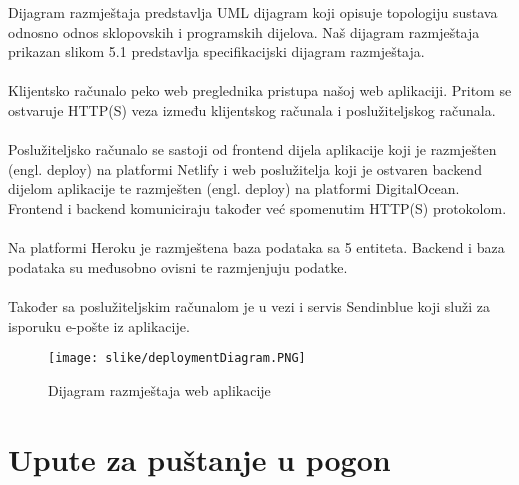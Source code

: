 			Dijagram razmještaja predstavlja UML dijagram koji opisuje topologiju sustava odnosno odnos sklopovskih i programskih dijelova. Naš dijagram razmještaja prikazan slikom 5.1 predstavlja specifikacijski dijagram razmještaja. \\ \\
			Klijentsko računalo peko web preglednika pristupa našoj web aplikaciji. Pritom se ostvaruje HTTP(S) veza između klijentskog računala i poslužiteljskog računala. \\ \\
			Poslužiteljsko računalo se sastoji od frontend dijela aplikacije koji je razmješten (engl. deploy) na platformi Netlify i web poslužitelja koji je ostvaren  backend dijelom aplikacije te razmješten (engl. deploy) na platformi DigitalOcean. Frontend i backend komuniciraju također već spomenutim HTTP(S) protokolom. \\ \\
			Na platformi Heroku je razmještena baza podataka sa 5 entiteta. Backend i baza podataka su međusobno ovisni te razmjenjuju podatke. \\ \\
			Također sa poslužiteljskim računalom je u vezi i servis Sendinblue koji služi za isporuku e-pošte iz aplikacije.
			
			\begin{figure}[H]
				\texttt{[image: slike/deploymentDiagram.PNG]} %
				\centering
				\caption{Dijagram razmještaja web aplikacije}
				\label{fig:promjene}
			\end{figure}
			
			\eject 
		
		\section{Upute za puštanje u pogon}
		
		
			
